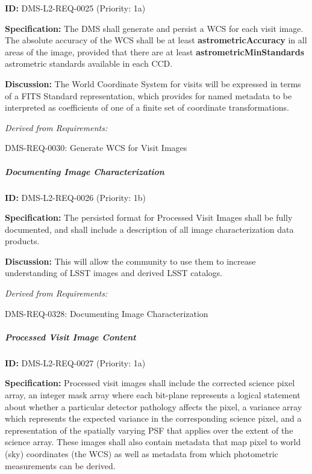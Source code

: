 \documentclass[SE,toc,lsstdraft]{lsstdoc}
\begin{document}
\label{DMS-L2-REQ-0025}
\textbf{ID:} DMS-L2-REQ-0025 (Priority: 1a)

\textbf{Specification:} The DMS shall generate and persist a WCS for each visit image.  The absolute accuracy of the WCS shall be at least \textbf{astrometricAccuracy} in all areas of the image, provided that there are at least \textbf{astrometricMinStandards} astrometric standards available in each CCD.

\textbf{Discussion:} The World Coordinate System for visits will be expressed in terms of a FITS Standard representation, which provides for named metadata to be interpreted as coefficients of one of a finite set of coordinate transformations.

\emph{Derived from Requirements:}

DMS-REQ-0030:
Generate WCS for Visit Images \newline

\subparagraph{Documenting Image Characterization}\hfill  %

\label{DMS-L2-REQ-0026}
\textbf{ID:} DMS-L2-REQ-0026 (Priority: 1b)

\textbf{Specification:} The persisted format for Processed Visit Images shall be fully documented, and shall include a description of all image characterization data products.

\textbf{Discussion:} This will allow the community to use them to increase understanding of LSST images and derived LSST catalogs.

\emph{Derived from Requirements:}

DMS-REQ-0328:
Documenting Image Characterization \newline

\subparagraph{Processed Visit Image Content}\hfill  %

\label{DMS-L2-REQ-0027}
\textbf{ID:} DMS-L2-REQ-0027 (Priority: 1a)

\textbf{Specification:} Processed visit images shall include the corrected science pixel array, an integer mask array where each bit-plane represents a logical statement about whether a particular detector pathology affects the pixel, a variance array which represents the expected variance in the corresponding science pixel, and a representation of the spatially varying PSF that applies over the extent of the science array. These images shall also contain metadata that map pixel to world (sky) coordinates (the WCS) as well as metadata from which photometric measurements can be derived.
\end{document}
